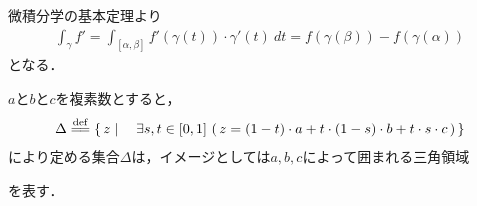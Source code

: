 	\begin{prf}
		微積分学の基本定理より
		\begin{align}
			\int_{\gamma} f'
			= \int_{[\alpha,\beta]} f'(\gamma(t)) \cdot \gamma'(t)\ dt
			= f(\gamma(\beta)) - f(\gamma(\alpha))
		\end{align}
		となる．
		\QED
	\end{prf}
	
	$a$と$b$と$c$を複素数とすると，
	\begin{align}
		\Delta \defeq \Set{z}{\exists s,t \in [0,1]\, 
		\left(\, z = (1-t) \cdot a 
		+ t \cdot (1-s) \cdot b 
		+ t \cdot s \cdot c\, \right)}
	\end{align}
	により定める集合$\Delta$は，イメージとしては$a,b,c$によって囲まれる三角領域
	
	\begin{center}
	\end{center}
	
	を表す．